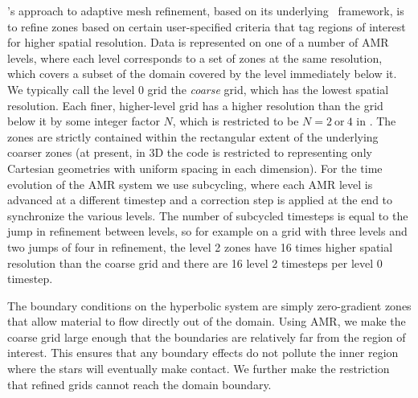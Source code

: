 \documentclass[12pt]{article}
\begin{document}
\castro's approach to adaptive mesh refinement, based on its underlying
\boxlib\ framework, is to refine zones based on certain user-specified
criteria that tag regions of interest for higher spatial
resolution. Data is represented on one of a number of AMR levels,
where each level corresponds to a set of zones at the same resolution,
which covers a subset of the domain covered by the level immediately
below it. We typically call the level 0 grid the \textit{coarse} grid,
which has the lowest spatial resolution. Each finer, higher-level grid
has a higher resolution than the grid below it by some integer factor
$N$, which is restricted to be $N = 2\ \text{or}\ 4$ in \castro. The
zones are strictly contained within the rectangular extent of the
underlying coarser zones (at present, in 3D the code is restricted to representing
only Cartesian geometries with uniform spacing in each dimension). For the time
evolution of the AMR system we use subcycling, where each AMR level is
advanced at a different timestep and a correction step is applied at
the end to synchronize the various levels. The number of
subcycled timesteps is equal to the jump in refinement between levels,
so for example on a grid with three levels and two jumps of four in
refinement, the level 2 zones have 16 times higher spatial
resolution than the coarse grid and there are 16 level 2 timesteps
per level 0 timestep.

The boundary conditions on the hyperbolic system are simply
zero-gradient zones that allow material to flow directly out of the
domain. Using AMR, we make the coarse grid large enough that the
boundaries are relatively far from the region of interest. This
ensures that any boundary effects do not pollute the inner region
where the stars will eventually make contact.  We further make the
restriction that refined grids cannot reach the domain boundary.
\end{document}
